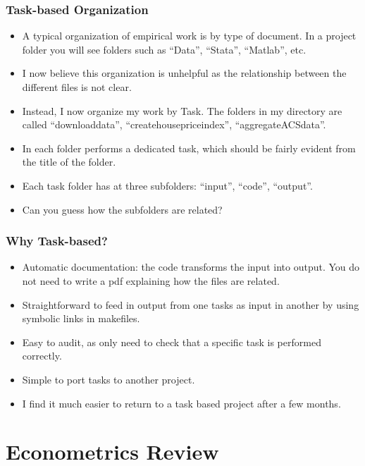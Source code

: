 \documentclass[english,xcolor=svgnames]{beamer}
\begin{document}
\begin{frame}
\frametitle[alignment=center]{Task-based Organization}
\begin{itemize}
	\item A typical organization of empirical work is by type of document. In a project folder you will see folders such as ``Data'', ``Stata'', ``Matlab'', etc.
	\item I now believe this organization is unhelpful as the relationship between the different files is not clear.
	\item Instead, I now organize my work by Task. The folders in my directory are called ``downloaddata'', ``createhousepriceindex'', ``aggregateACSdata''.
	\item In each folder performs a dedicated task, which should be fairly evident from the title of the folder.
	\item Each task folder has at three subfolders: ``input'', ``code'', ``output''.
	\item Can you guess how the subfolders are related?
\end{itemize}
\end{frame}

\begin{frame}
\frametitle[alignment=center]{Why Task-based?}
\begin{itemize}
	\item Automatic documentation: the code transforms the input into output. You do not need to write a pdf explaining how the files are related.
	\item Straightforward to feed in output from one tasks as input in another by using symbolic links in makefiles.
	\item Easy to audit, as only need to check that a specific task is performed correctly.
	\item Simple to port tasks to another project.
	\item I find it much easier to return to a task based project after a few months.
\end{itemize}
\end{frame}



\section{Econometrics Review}
\end{document}
